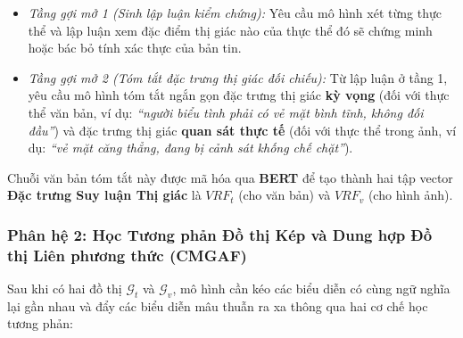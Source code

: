 \documentclass[conference,10pt]{IEEEtran}
\begin{document}
\begin{itemize}
    \begin{itemize}
        \item \textit{Tầng gợi mở 1 (Sinh lập luận kiểm chứng):} Yêu cầu mô hình xét từng thực thể và lập luận xem đặc điểm thị giác nào của thực thể đó sẽ chứng minh hoặc bác bỏ tính xác thực của bản tin.
        \item \textit{Tầng gợi mở 2 (Tóm tắt đặc trưng thị giác đối chiếu):} Từ lập luận ở tầng 1, yêu cầu mô hình tóm tắt ngắn gọn đặc trưng thị giác \textbf{kỳ vọng} (đối với thực thể văn bản, ví dụ: \textit{``người biểu tình phải có vẻ mặt bình tĩnh, không đối đầu''}) và đặc trưng thị giác \textbf{quan sát thực tế} (đối với thực thể trong ảnh, ví dụ: \textit{``vẻ mặt căng thẳng, đang bị cảnh sát khống chế chặt''}).
    \end{itemize}
    Chuỗi văn bản tóm tắt này được mã hóa qua \textbf{BERT} để tạo thành hai tập vector \textbf{Đặc trưng Suy luận Thị giác} là $VRF_t$ (cho văn bản) và $VRF_v$ (cho hình ảnh).
\end{itemize}

\subsubsection{Phân hệ 2: Học Tương phản Đồ thị Kép và Dung hợp Đồ thị Liên phương thức (CMGAF)}

Sau khi có hai đồ thị $\mathcal{G}_t$ và $\mathcal{G}_v$, mô hình cần kéo các biểu diễn có cùng ngữ nghĩa lại gần nhau và đẩy các biểu diễn mâu thuẫn ra xa thông qua hai cơ chế học tương phản:
\end{document}
